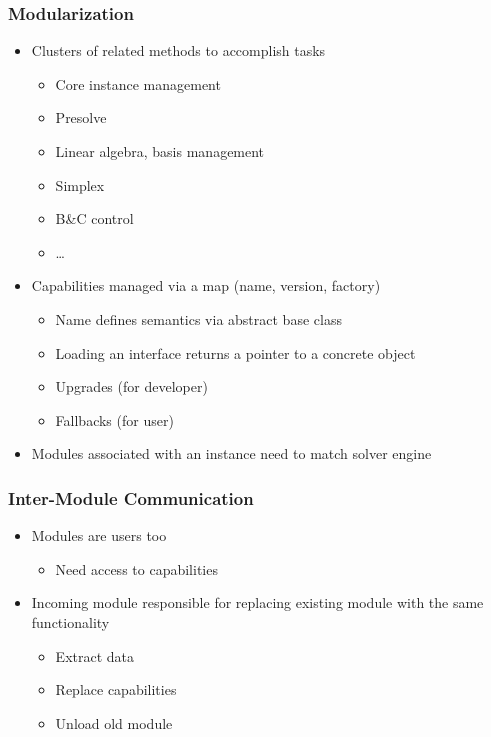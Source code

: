 \documentclass{beamer}
\begin{document}
\begin{frame}
  \frametitle{Modularization}

  \begin{itemize}
  \item Clusters of related methods to accomplish tasks
    \begin{itemize}
    \item Core instance management
    \item Presolve
    \item Linear algebra, basis management
    \item Simplex
    \item B\&C control
    \item \dots
    \end{itemize}
  \item Capabilities managed via a map (name, version, factory)
    \begin{itemize}
    \item Name defines semantics via abstract base class
    \item Loading an interface returns a pointer to a concrete object
    \item Upgrades (for developer)
    \item Fallbacks (for user)
    \end{itemize}
  \item Modules associated with an instance need to match solver engine
  \end{itemize}
\end{frame}

\begin{frame}
  \frametitle{Inter-Module Communication}

  \begin{itemize}
  \item Modules are users too
    \begin{itemize}
    \item Need access to capabilities
    \end{itemize}
  \item Incoming module responsible for replacing existing module
    with the same functionality
    \begin{itemize}
    \item Extract data
    \item Replace capabilities
    \item Unload old module
    \end{itemize}

  \end{itemize}
\end{frame}
\end{document}
